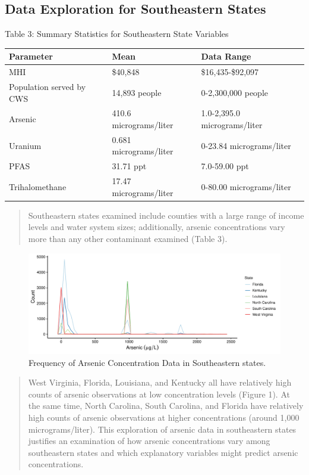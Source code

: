 \documentclass[12pt,]{article}
\begin{document}
\hypertarget{data-exploration-for-southeastern-states}{%
\subsection{Data Exploration for Southeastern
States}\label{data-exploration-for-southeastern-states}}

Table 3: Summary Statistics for Southeastern State Variables

\begin{longtable}[]{@{}lll@{}}
\toprule
\textbf{Parameter} & \textbf{Mean} & \textbf{Data Range}\tabularnewline
\midrule
\endhead
MHI & \$40,848 & \$16,435-\$92,097\tabularnewline
Population served by CWS & 14,893 people & 0-2,300,000
people\tabularnewline
Arsenic & 410.6 micrograms/liter & 1.0-2,395.0
micrograms/liter\tabularnewline
Uranium & 0.681 micrograms/liter & 0-23.84
micrograms/liter\tabularnewline
PFAS & 31.71 ppt & 7.0-59.00 ppt\tabularnewline
Trihalomethane & 17.47 micrograms/liter & 0-80.00
micrograms/liter\tabularnewline
\bottomrule
\end{longtable}

\begin{quote}
Southeastern states examined include counties with a large range of
income levels and water system sizes; additionally, arsenic
concentrations vary more than any other contaminant examined (Table 3).
\end{quote}

\begin{figure}
\centering
\includegraphics{Project_Template_files/figure-latex/figs-1.pdf}
\caption{Frequency of Arsenic Concentration Data in Southeastern
states.}
\end{figure}

\begin{quote}
West Virginia, Florida, Louisiana, and Kentucky all have relatively high
counts of arsenic observations at low concentration levels (Figure 1).
At the same time, North Carolina, South Carolina, and Florida have
relatively high counts of arsenic observations at higher concentrations
(around 1,000 micrograms/liter). This exploration of arsenic data in
southeastern states justifies an examination of how arsenic
concentrations vary among southeastern states and which explanatory
variables might predict arsenic concentrations.
\end{quote}
\end{document}

